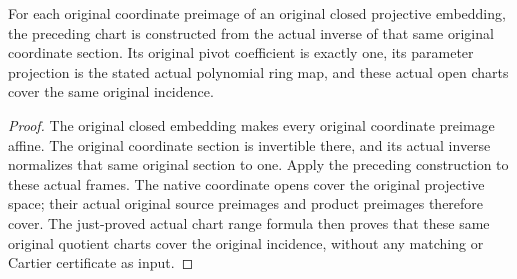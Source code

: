 \begin{corollary}
\label{cor:kn-nadel-bertini-projective-polynomial-chart}
\leanok
{}
For each original coordinate preimage of an original closed projective
embedding, the preceding chart is constructed from the actual inverse of
that same original coordinate section. Its original pivot coefficient
is exactly one, its parameter projection is the stated actual polynomial
ring map, and these actual open charts cover the same original incidence.
\end{corollary}
\begin{proof}
The original closed embedding makes every original coordinate preimage
affine. The original coordinate section is invertible there, and its
actual inverse normalizes that same original section to one. Apply the
preceding construction to these actual frames. The native coordinate
opens cover the original projective space; their actual original source
preimages and product preimages therefore cover. The just-proved actual
chart range formula then proves that these same original quotient charts
cover the original incidence, without any matching or Cartier certificate
as input.
\end{proof}
